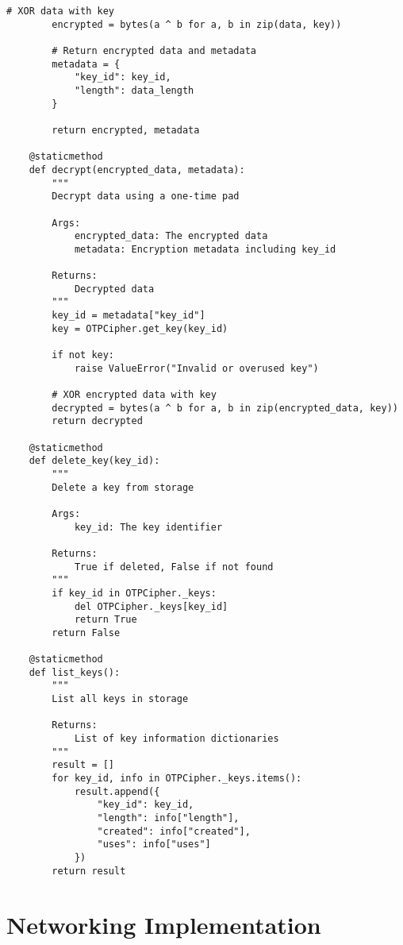 \documentclass[12pt,a4paper]{report}
\begin{document}
\begin{lstlisting}[style=python, caption=One-Time Pad Implementation]
        # XOR data with key
        encrypted = bytes(a ^ b for a, b in zip(data, key))
        
        # Return encrypted data and metadata
        metadata = {
            "key_id": key_id,
            "length": data_length
        }
        
        return encrypted, metadata
    
    @staticmethod
    def decrypt(encrypted_data, metadata):
        """
        Decrypt data using a one-time pad
        
        Args:
            encrypted_data: The encrypted data
            metadata: Encryption metadata including key_id
            
        Returns:
            Decrypted data
        """
        key_id = metadata["key_id"]
        key = OTPCipher.get_key(key_id)
        
        if not key:
            raise ValueError("Invalid or overused key")
            
        # XOR encrypted data with key
        decrypted = bytes(a ^ b for a, b in zip(encrypted_data, key))
        return decrypted
    
    @staticmethod
    def delete_key(key_id):
        """
        Delete a key from storage
        
        Args:
            key_id: The key identifier
            
        Returns:
            True if deleted, False if not found
        """
        if key_id in OTPCipher._keys:
            del OTPCipher._keys[key_id]
            return True
        return False
    
    @staticmethod
    def list_keys():
        """
        List all keys in storage
        
        Returns:
            List of key information dictionaries
        """
        result = []
        for key_id, info in OTPCipher._keys.items():
            result.append({
                "key_id": key_id,
                "length": info["length"],
                "created": info["created"],
                "uses": info["uses"]
            })
        return result
\end{lstlisting}

\section{Networking Implementation}
\end{document}
